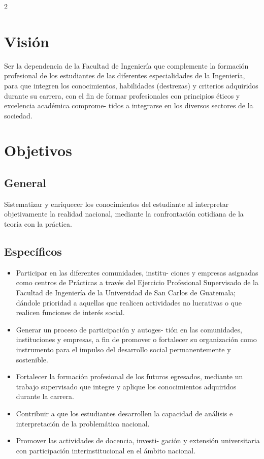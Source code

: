 \documentclass[12pt,spanish,Letterpaper,openany]{book}
\begin{document}
\begin {multicols}{2}
\hypertarget{visiuxf3n}{%
\section*{Visión}\label{visiuxf3n}}

Ser la dependencia de la Facultad de Ingeniería que complemente la formación profesional de los estudiantes de las diferentes especialidades de la Ingeniería, para que integren los conocimientos, habilidades (destrezas) y criterios adquiridos durante su carrera, con el fin de formar profesionales con principios éticos y excelencia académica comprome-
tidos a integrarse en los diversos sectores de la sociedad.

\hypertarget{objetivos}{%
\section*{Objetivos}\label{objetivos}}

\hypertarget{general}{%
\subsection*{General}\label{general}}

Sistematizar y enriquecer los conocimientos del estudiante al interpretar objetivamente la realidad nacional, mediante la confrontación cotidiana de la teoría con la práctica.

\hypertarget{especuxedficos}{%
\subsection*{Específicos}\label{especuxedficos}}

\begin{itemize}
\item
  Participar en las diferentes comunidades, institu-
  ciones y empresas asignadas como centros de Prácticas a través del Ejercicio Profesional Supervisado de la Facultad de Ingeniería de la Universidad de San Carlos de Guatemala; dándole prioridad a aquellas que realicen actividades no lucrativas o que realicen funciones de interés social.
\item
  Generar un proceso de participación y autoges-
  tión en las comunidades, instituciones y empresas, a fin de promover o fortalecer su organización como instrumento para el impulso del desarrollo social permanentemente y sostenible.
\item
  Fortalecer la formación profesional de los futuros egresados, mediante un trabajo supervisado que integre y aplique los conocimientos adquiridos durante la carrera.
\item
  Contribuir a que los estudiantes desarrollen la capacidad de análisis e interpretación de la problemática nacional.
\item
  Promover las actividades de docencia, investi-
  gación y extensión universitaria con participación interinstitucional en el ámbito nacional.
\end{itemize}


\end{multicols}
\end{document}
